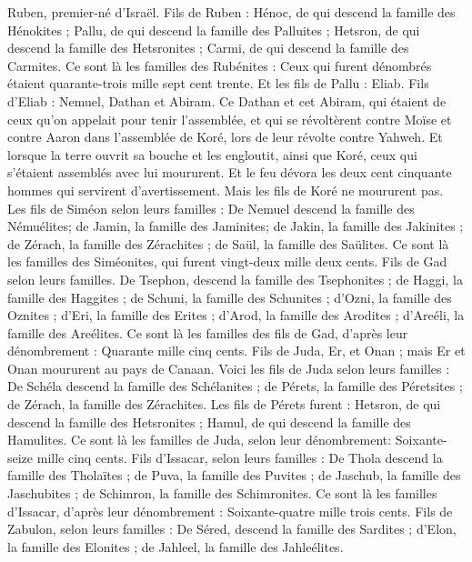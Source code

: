 \begin{multicols}{2}
Ruben, premier-né d'Israël. Fils de Ruben : Hénoc, de qui descend la famille des Hénokites ; Pallu, de qui descend la famille des Palluites ;
Hetsron, de qui descend la famille des Hetsronites ; Carmi, de qui descend la famille des Carmites.
Ce sont là les familles des Rubénites : Ceux qui furent dénombrés étaient quarante-trois mille sept cent trente.
Et les fils de Pallu : Eliab.
Fils d'Eliab : Nemuel, Dathan et Abiram. Ce Dathan et cet Abiram, qui étaient de ceux qu’on appelait pour tenir l’assemblée, et qui se révoltèrent contre Moïse et contre Aaron dans l'assemblée de Koré, lors de leur révolte contre Yahweh.
Et lorsque la terre ouvrit sa bouche et les engloutit, ainsi que Koré, ceux qui s'étaient assemblés avec lui moururent. Et le feu dévora les deux cent cinquante hommes qui servirent d'avertissement.
Mais les fils de Koré ne moururent pas.
Les fils de Siméon selon leurs familles : De Nemuel descend la famille des Némuélites; de Jamin, la famille des Jaminites; de Jakin, la famille des Jakinites ;
de Zérach, la famille des Zérachites ; de Saül, la famille des Saülites.
Ce sont là les familles des Siméonites, qui furent vingt-deux mille deux cents.
Fils de Gad selon leurs familles. De Tsephon, descend la famille des Tsephonites ; de Haggi, la famille des Haggites ; de Schuni, la famille des Schunites ;
d'Ozni, la famille des Oznites ; d'Eri, la famille des Erites ;
d'Arod, la famille des Arodites ; d'Areéli, la famille des Areélites.
Ce sont là les familles des fils de Gad, d'après leur dénombrement : Quarante mille cinq cents.
Fils de Juda, Er, et Onan ; mais Er et Onan moururent au pays de Canaan.
Voici les fils de Juda selon leurs familles : De Schéla descend la famille des Schélanites ; de Pérets, la famille des Péretsites ; de Zérach, la famille des Zérachites.
Les fils de Pérets furent : Hetsron, de qui descend la famille des Hetsronites ; Hamul, de qui descend la famille des Hamulites.
Ce sont là les familles de Juda, selon leur dénombrement: Soixante-seize mille cinq cents.
Fils d'Issacar, selon leurs familles : De Thola descend la famille des Tholaïtes ; de Puva, la famille des Puvites ;
de Jaschub, la famille des Jaschubites ; de Schimron, la famille des Schimronites.
Ce sont là les familles d'Issacar, d'après leur dénombrement : Soixante-quatre mille trois cents.
Fils de Zabulon, selon leurs familles : De Séred, descend la famille des Sardites ; d'Elon, la famille des Elonites ; de Jahleel, la famille des Jahleélites.

\end{multicols}
